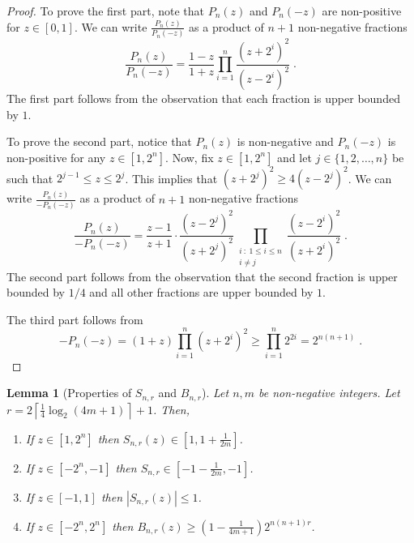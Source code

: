 \documentclass[12pt]{article}
\newtheorem{lemma}[definition]{Lemma}
\begin{document}
\begin{proof}
To prove the first part, note that $P_n(z)$ and $P_n(-z)$ are non-positive for
$z \in [0,1]$. We can write $\frac{P_n(z)}{P_n(-z)}$ as a product of $n+1$
non-negative fractions
$$
\frac{P_n(z)}{P_n(-z)} = \frac{1-z}{1+z} \prod_{i=1}^n \frac{(z+2^i)^2}{(z-2^i)^2} \; .
$$
The first part follows from the observation that each fraction is upper bounded
by $1$.

To prove the second part, notice that $P_n(z)$ is non-negative and $P_n(-z)$ is
non-positive for any $z \in [1,2^n]$. Now, fix $z \in [1,2^n]$ and let $j \in
\{1,2,\dots,n\}$ be such that $2^{j-1} \le z \le 2^j$. This implies that
$(z+2^{j})^2 \ge 4 (z - 2^j)^2$. We can write $\frac{P_n(z)}{-P_n(-z)}$ as a
product of $n+1$ non-negative fractions
$$
\frac{P_n(z)}{-P_n(-z)}
= \frac{z-1}{z+1} \cdot \frac{(z-2^j)^2}{(z+2^j)^2} \prod_{\substack{i ~:~ 1 \le i \le n \\ i \neq j}} \frac{(z-2^i)^2}{(z+2^i)^2} \; .
$$
The second part follows from the observation that the second fraction is upper
bounded by $1/4$ and all other fractions are upper bounded by $1$.

The third part follows from
$$
-P_n(-z) = (1+z) \prod_{i=1}^n (z+2^i)^2 \ge \prod_{i=1}^n 2^{2i} = 2^{n(n+1)} \; .
$$
\end{proof}

\begin{lemma}[Properties of $S_{n,r}$ and $B_{n,r}$]
\label{lemma:properties-of-s-n-r}
Let $n,m$ be non-negative integers.
Let $r = 2 \left\lceil \frac{1}{4} \log_2(4m + 1) \right\rceil + 1$. Then,
\begin{enumerate}
\item If $z \in [1,2^n]$ then $S_{n,r}(z) \in [1,1+\frac{1}{2m}]$.
\item If $z \in [-2^n, -1]$ then $S_{n,r} \in [-1-\frac{1}{2m}, -1]$.
\item If $z \in [-1,1]$ then $|S_{n,r}(z)| \le 1$.
\item If $z \in [-2^n,2^n]$ then $B_{n,r}(z) \ge \left(1 - \frac{1}{4m+1} \right) 2^{n(n+1)r}$.
\end{enumerate}
\end{lemma}
\end{document}
